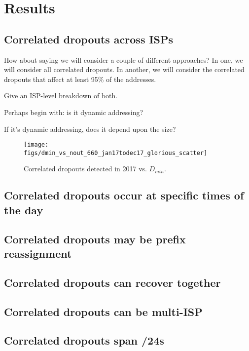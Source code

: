 

\section{Results}

\subsection{Correlated dropouts across ISPs}

How about saying we will consider a couple of different approaches? In
one, we will consider all correlated dropouts. In another, we will
consider the correlated dropouts that affect at least 95\% of the
addresses.

Give an ISP-level breakdown of both.

Perhaps begin with: is it dynamic addressing?

If it's dynamic addressing, does it depend upon the size?

\begin{figure}[t]
\centering
\texttt{[image: figs/dmin\_vs\_nout\_660\_jan17todec17\_glorious\_scatter]}
\caption{
\label{fig:dmin_vs_nouts}
Correlated dropouts detected in 2017 vs. $D_{min}$.}
\end{figure}

\subsection{Correlated dropouts occur at specific times of the day}

\subsection{Correlated dropouts may be prefix reassignment}

\subsection{Correlated dropouts can recover together}

\subsection{Correlated dropouts can be multi-ISP}

\subsection{Correlated dropouts span /24s}
